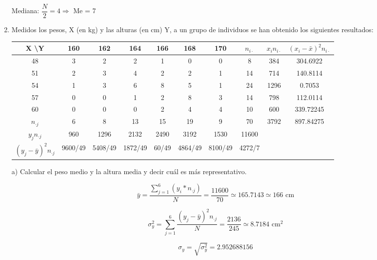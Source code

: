 \documentclass[10pt,a4paper]{article}
\begin{document}
\begin{enumerate}
\vspace{0.25cm}
Mediana: $\dfrac{N}{2} = 4 \Rightarrow $ Me = 7

\newpage
\item Medidos los pesos, X (en kg) y las alturas (en cm) Y, a un grupo de individuos se han obtenido los siguientes resultados:

\vspace{0.5cm}
\begin{tabular}{|c|c|c|c|c|c|c|c|c|c|}
\hline 
X \textbackslash Y & 160 & 162 & 164 & 166 & 168 & 170 & $n_{i\cdot}$ & $x_in_{i\cdot}$ & $(x_i - \bar{x})^2 n_{i\cdot}$ \\ 
\hline 
48 & 3 & 2 & 2 & 1 & 0 & 0 & 8 & 384 & 304.6922 \\ 
\hline 
51 & 2 & 3 & 4 & 2 & 2 & 1 & 14 & 714 & 140.8114 \\ 
\hline 
54 & 1 & 3 & 6 & 8 & 5 & 1 & 24 & 1296 & 0.7053 \\ 
\hline 
57 & 0 & 0 & 1 & 2 & 8 & 3 & 14 & 798 & 112.0114 \\ 
\hline 
60 & 0 & 0 & 0 & 2 & 4 & 4 & 10 & 600 & 339.72245 \\ 
\hline 
$n_{\cdot j}$ & 6 & 8 & 13 & 15 & 19 & 9 & 70 & 3792 & 897.84275 \\ 
\hline 
$y_jn_{\cdot j}$ & 960 & 1296 & 2132 & 2490 & 3192 & 1530 & 11600 &   &   \\ 
\hline 
$(y_j - \bar{y})^2 n_{\cdot j}$ & 9600/49 & 5408/49 & 1872/49 & 60/49 & 4864/49 & 8100/49 & 4272/7 &   &   \\ 
\hline 
\end{tabular}

\vspace{0.5cm}
\hspace{0.25cm} a) Calcular el peso medio y la altura media y decir cuál es más representativo.

\begin{equation*}
\bar{y} = \dfrac{\displaystyle\sum_{j = 1}^6(y_{i}*n_{\cdot j})}{N} = \frac{11600}{70} \simeq 165.7143 \simeq 166 \textrm{ cm}
\end{equation*}

\begin{equation*}
\sigma_y^2 = \displaystyle\sum_{j = 1}^6 \dfrac{(y_j - \bar{y})^2 n_{\cdot j}}{N} = \dfrac{2136}{245} \simeq 8.7184 \textrm{ cm}^2
\end{equation*}

\begin{equation*}
\sigma_y = \sqrt{\sigma_y^2} = 2.952688156
\end{equation*}


\end{enumerate}
\end{document}

